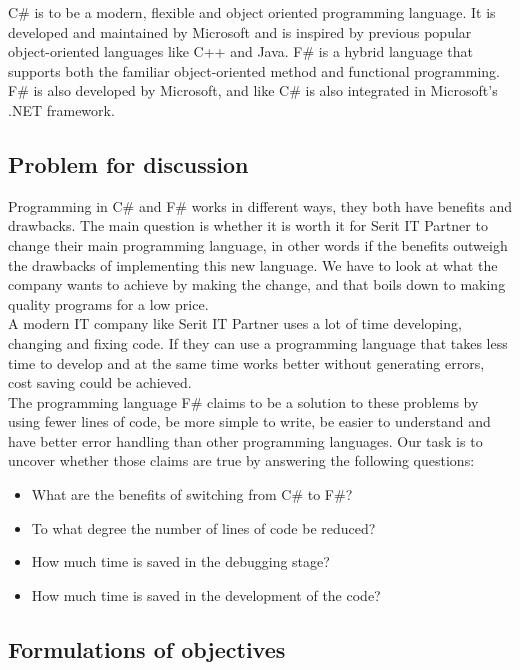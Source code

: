 \documentclass[12pt, a4paper]{article}
\begin{document}
C\# is to be a modern, flexible and object oriented programming language. It is developed and maintained by Microsoft and is inspired by previous popular object-oriented languages like C++ and Java. F\# is a hybrid language that supports both the familiar object-oriented method and functional programming. F\# is also developed by Microsoft, and like C\# is also integrated in Microsoft’s .NET framework.

\newpage
\subsection{Problem for discussion}
Programming in C\# and F\# works in different ways, they both have benefits and drawbacks. The main question is whether it is worth it for Serit IT Partner to change their main programming language, in other words if the benefits outweigh the drawbacks of implementing this new language. We have to look at what the company wants to achieve by making the change, and that boils down to making quality programs for a low price. \\

A modern IT company like Serit IT Partner uses a lot of time developing, changing and fixing code. If they can use a programming language that takes less time to develop and at the same time works better without generating errors, cost saving could be achieved.\\

The programming language F\# claims to be a solution to these problems by using fewer lines of code, be more simple to write, be easier to understand and have better error handling than other programming languages. Our task is to uncover whether those claims are true by answering the following questions:

\begin{itemize}
\item What are the benefits of switching from C\# to F\#?
\item To what degree the number of lines of code be reduced?
\item How much time is saved in the debugging stage?
\item How much time is saved in the development of the code?
\end{itemize}

\newpage

\subsection{Formulations of objectives}
\end{document}
